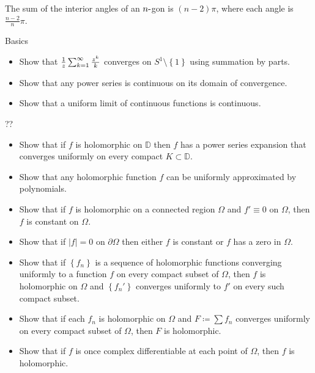 The sum of the interior angles of an \(n{\hbox{-}}\)gon is \((n-2)\pi\),
where each angle is \(\frac{n-2}{n}\pi\).

Basics

\begin{itemize}
\tightlist
\item
  Show that \({1\over z} \sum_{k=1}^\infty {z^k \over k}\) converges on
  \(S^1 \setminus\left\{{1}\right\}\) using summation by parts.
\item
  Show that any power series is continuous on its domain of convergence.
\item
  Show that a uniform limit of continuous functions is continuous.
\end{itemize}

??

\begin{itemize}
\item
  Show that if \(f\) is holomorphic on \({\mathbb{D}}\) then \(f\) has a
  power series expansion that converges uniformly on every compact
  \(K\subset {\mathbb{D}}\).
\item
  Show that any holomorphic function \(f\) can be uniformly approximated
  by polynomials.
\item
  Show that if \(f\) is holomorphic on a connected region \(\Omega\) and
  \(f'\equiv 0\) on \(\Omega\), then \(f\) is constant on \(\Omega\).
\item
  Show that if \({\left\lvert {f} \right\rvert} = 0\) on
  \({{\partial}}\Omega\) then either \(f\) is constant or \(f\) has a
  zero in \(\Omega\).
\item
  Show that if \(\left\{{f_n}\right\}\) is a sequence of holomorphic
  functions converging uniformly to a function \(f\) on every compact
  subset of \(\Omega\), then \(f\) is holomorphic on \(\Omega\) and
  \(\left\{{f_n'}\right\}\) converges uniformly to \(f'\) on every such
  compact subset.
\item
  Show that if each \(f_n\) is holomorphic on \(\Omega\) and
  \(F \coloneqq\sum f_n\) converges uniformly on every compact subset of
  \(\Omega\), then \(F\) is holomorphic.
\item
  Show that if \(f\) is once complex differentiable at each point of
  \(\Omega\), then \(f\) is holomorphic.
\end{itemize}


\printbibliography[title=Bibliography]



